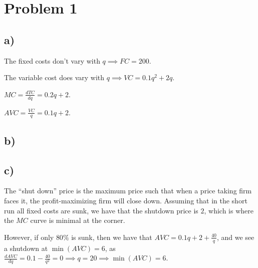 \documentclass[12pt,letterpaper]{article}
\theoremstyle{definition}
\begin{document}
\section*{Problem 1}

\subsection*{a)}

The fixed costs don't vary with $q \implies FC = 200$.

The variable cost does vary with $q \implies VC = 0.1q^2 + 2q$.

$MC = \frac{dTC}{dq} = 0.2q + 2$.

$AVC = \frac{VC}{q} = 0.1q + 2$.

\subsection*{b)}
\begin{center}
\end{center}

\subsection*{c)}

The ``shut down'' price is the maximum price such that when a price taking firm
faces it, the profit-maximizing firm will close down. Assuming that in the short
run all fixed costs are sunk, we have that the shutdown price is $2$, which is
where the $MC$ curve is minimal at the corner.

However, if only $80\%$ is sunk, then we have that $AVC = 0.1q + 2 +
\frac{40}{q}$, and we see a shutdown at $\min(AVC) = 6$, as $\frac{dAVC}{dq} =
0.1 - \frac{40}{q^2} = 0 \implies q = 20 \implies \min(AVC) = 6$.
\end{document}
